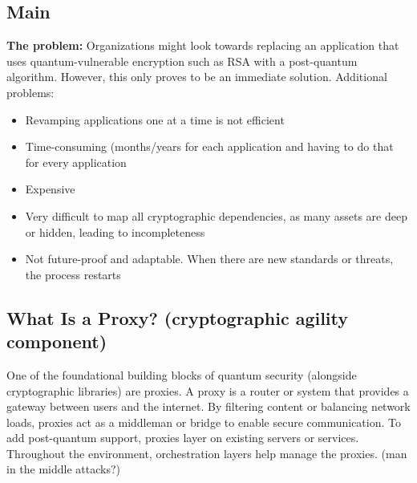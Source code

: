 \documentclass{article}
\begin{document}
\subsection{Main}
\textbf{The problem:}
Organizations might look towards replacing an application that uses quantum-vulnerable encryption such as RSA with a post-quantum algorithm. However, this only proves to be an immediate solution. Additional problems:
\begin{itemize}
    \item Revamping applications one at a time is not efficient
    \item Time-consuming (months/years for each application and having to do that for every application
    \item Expensive
    \item Very difficult to map all cryptographic dependencies, as many assets are deep or hidden, leading to incompleteness 
    \item Not future-proof and adaptable. When there are new standards or threats, the process restarts
\end{itemize}

\subsection{What Is a Proxy? (cryptographic agility component)}
One of the foundational building blocks of quantum security (alongside cryptographic libraries) are proxies. A proxy is a router or system that provides a gateway between users and the internet. By filtering content or balancing network loads, proxies act as a middleman or bridge to enable secure communication. To add post-quantum support, proxies layer on existing servers or services. Throughout the environment, orchestration layers help manage the proxies. (man in the middle attacks?) 
\end{document}
